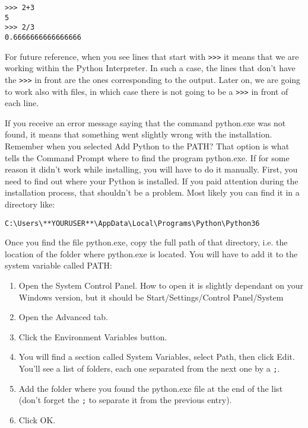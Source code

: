 \begin{verbatim}
>>> 2+3
5
>>> 2/3
0.6666666666666666
\end{verbatim}

For future reference, when you see lines that start with \texttt{>>>} it means that we are working within the Python Interpreter. In such a case, the lines that don’t have the \texttt{>>>} in front are the ones corresponding to the output. Later on, we are going to work also with files, in which case there is not going to be a \texttt{>>>} in front of each line.

If you receive an error message saying that the command python.exe was not found, it means that something went slightly wrong with the installation. Remember when you selected Add Python to the PATH? That option is what tells the Command Prompt where to find the program python.exe. If for some reason it didn’t work while installing, you will have to do it manually. First, you need to find out where your Python is installed. If you paid attention during the installation process, that shouldn’t be a problem. Most likely you can find it in a directory like:

\begin{verbatim}
C:\Users\**YOURUSER**\AppData\Local\Programs\Python\Python36
\end{verbatim}

Once you find the file python.exe, copy the full path of that directory, i.e. the location of the folder where python.exe is located. You will have to add it to the system variable called PATH:

\begin{enumerate}
 \item Open the System Control Panel. How to open it is slightly dependant on your Windows version, but it should be Start/Settings/Control Panel/System
 \item Open the Advanced tab.
 \item Click the Environment Variables button.
 \item You will find a section called System Variables, select Path, then click Edit. You’ll see a list of folders, each one separated from the next one by a \texttt{;}.
 \item Add the folder where you found the python.exe file at the end of the list (don’t forget the \texttt{;} to separate it from the previous entry). 
\item Click OK.
\end{enumerate}

